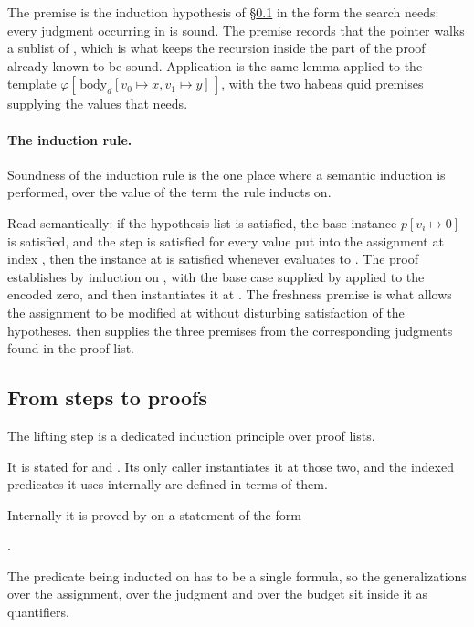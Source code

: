 
\noindent
The premise  is the induction hypothesis of \S\ref{sec:list} in the
form the search needs: every judgment occurring in  is sound.  The
premise  records that the pointer walks a sublist of , which
is what keeps the recursion inside the part of the proof already known to be
sound.  Application is the same lemma applied to the template
$\varphi[\,\mathrm{body}_d[v_0 \mapsto x, v_1 \mapsto y]\,]$, with the two
habeas quid premises supplying the values that  needs.

\paragraph{The induction rule.}
Soundness of the induction rule is the one place where a semantic induction is
performed, over the value of the term the rule inducts on.


\noindent
Read semantically: if the hypothesis list is satisfied, the base instance
$p[v_i \mapsto 0]$ is satisfied, and the step is satisfied for every value
 put into the assignment at index , then the instance at 
is satisfied whenever  evaluates to .  The proof establishes
 by \QGA{} induction on ,
with the base case supplied by  applied to the
encoded zero, and then instantiates it at .  The freshness premise
 is what
allows the assignment to be modified at  without disturbing satisfaction
of the hypotheses.   then supplies the three
premises from the corresponding judgments found in the proof list.

\subsection{From steps to proofs}
\label{sec:list}

The lifting step is a dedicated induction principle over proof lists.


\noindent
It is stated for  and .  Its only caller
instantiates it at those two, and the indexed predicates it uses internally are
defined in terms of them.

Internally it is proved by  on a statement of the form
\begin{center}
.
\end{center}
The predicate being inducted on has to be a single formula, so the
generalizations over the assignment, over the judgment and over the budget sit
inside it as \QGA{} quantifiers.

